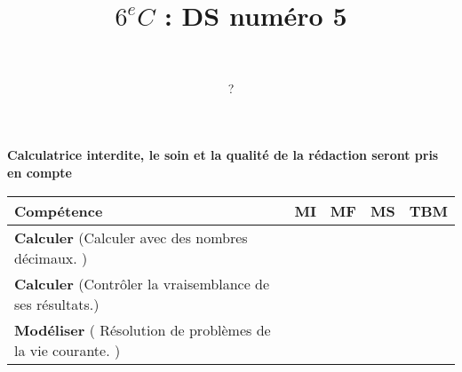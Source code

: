 \documentclass[a4paper,11pt]{exam}
\author{\ }
\date{?}
\title{$6^e C$ : DS num\'ero 5}
\begin{document}
%	

	\maketitle
	
\begin{center}
	\textbf{Calculatrice interdite, le soin et la qualité de la rédaction seront pris en compte}
\end{center}

\begin{small}
	\begin{center}
		\begin{tabular}{|@{\ }l@{\ }|@{\ }c@{\ }|@{\ }c@{\ }|@{\ }c@{\ }|@{\ }c@{\ }|}
			\hline
			\textbf{Compétence} & \textbf{MI} & \textbf{MF} & \textbf{MS} & \textbf{TBM} \\
			\hline
			\textbf{Calculer} (Calculer avec des nombres décimaux. ) &  \ \ & \ \ & \ \ & \ \  \\
			\hline	
			\textbf{Calculer} (Contrôler la vraisemblance de ses résultats.) & \ \ & \ \ &  \ \  & \ \ \\
			\hline
			\textbf{Modéliser} ( Résolution de problèmes de la vie courante. ) &  \ \ & \ \ & \ \ & \ \  \\
			\hline
		\end{tabular}
	\end{center}
\end{small}	

	
	
	











\label{LastPage}

%
\end{document}
